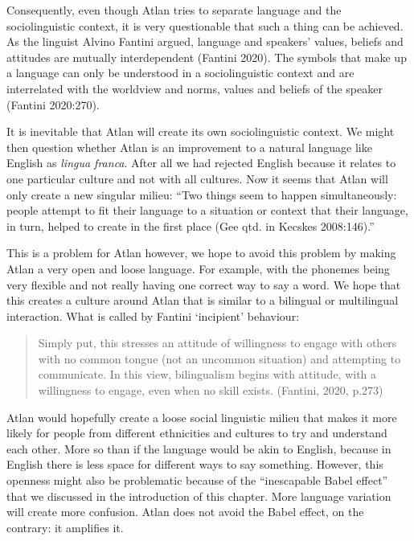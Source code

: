 Consequently, even though Atlan tries to separate language and the sociolinguistic context, it is very questionable that such a thing can be achieved. As the linguist Alvino Fantini argued, language and speakers' values, beliefs and attitudes are mutually interdependent (Fantini 2020). The symbols that make up a language can only be understood in a sociolinguistic context and are interrelated with the worldview and norms, values and beliefs of the speaker (Fantini 2020:270).

It is inevitable that Atlan will create its own sociolinguistic context. We might then question whether Atlan is an improvement to a natural language like English as {\it lingua franca}. After all we had rejected English because it relates to one particular culture and not with all cultures. Now it seems that Atlan will only create a new singular milieu: “Two things seem to happen simultaneously: people attempt to fit their language to a situation or context that their language, in turn, helped to create in the first place (Gee qtd. in Kecskes 2008:146).”  				 

This is a problem for Atlan however, we hope to avoid this problem by making Atlan a very open and loose language. For example, with the phonemes being very flexible and not really having one correct way to say a word. We hope that this creates a culture around  Atlan that is similar to a bilingual or multilingual interaction. What is called by Fantini ‘incipient’ behaviour: 

\begin{quote} 

Simply put, this stresses an attitude of willingness to 	engage with others with no common tongue (not an		uncommon situation) and attempting to communicate. In 	this view, bilingualism begins with attitude, with a 		willingness to engage, even when no skill exists.	(Fantini, 2020, p.273)  

\end{quote} 

Atlan would hopefully create a loose social linguistic milieu that makes it more likely for people from different ethnicities and cultures to try and understand each other. More so than if the language would be akin to English, because in English there is less space for different ways to say something. However, this openness might also be problematic because of the “inescapable Babel effect” that we discussed in the introduction of this chapter. More language variation will create more confusion. Atlan does not avoid the Babel effect, on the contrary: it amplifies it.

